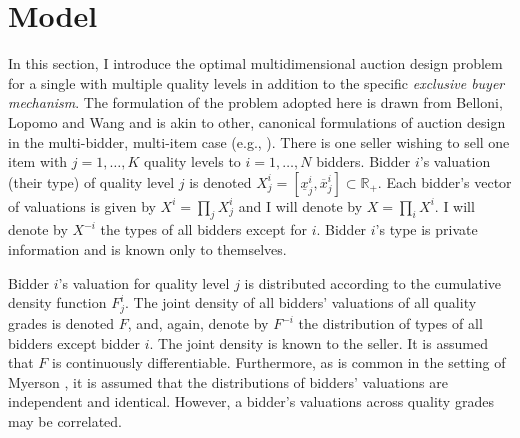 \documentclass{article}
\begin{document}



\section{Model}\label{sec_model}

In this section, I introduce the optimal multidimensional auction design problem for a single with multiple quality levels in addition to the specific \textit{exclusive buyer mechanism}. The formulation of the problem adopted here is drawn from Belloni, Lopomo and Wang \autocite*{belloni2010multidimensional} and is akin to other, canonical formulations of auction design in the multi-bidder, multi-item case (e.g., \cite{cai2016}). There is one seller wishing to sell one item with $j = 1,\dots,K$ quality levels to $i=1,\dots,N$ bidders. Bidder $i$'s valuation (their type) of quality level $j$ is denoted $X_j^i = [\underline{x}_j^i, \overline{x}_j^i] \subset \mathbb{R}_+$. Each bidder's vector of valuations is given by $X^i = \prod_j X_j^i$ and I will denote by $X = \prod_i X^i$. I will denote by $X^{-i}$ the types of all bidders except for $i$. Bidder $i$'s type is private information and is known only to themselves. 

Bidder $i$'s valuation for quality level $j$ is distributed according to the cumulative density function $F_j^i$. The joint density of all bidders' valuations of all quality grades is denoted $F$, and, again, denote by $F^{-i}$ the distribution of types of all bidders except bidder $i$. The joint density is known to the seller. It is assumed that $F$ is continuously differentiable. Furthermore, as is common in the setting of Myerson \autocite*{myerson1981optimal}, it is assumed that the distributions of bidders' valuations are independent and identical. However, a bidder's valuations across quality grades may be correlated.
\end{document}
